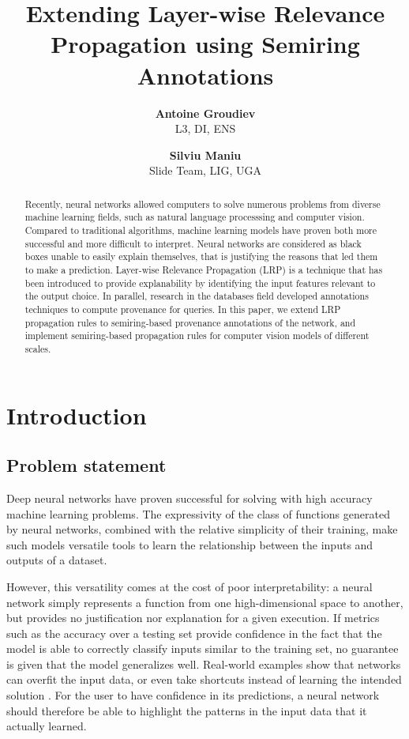 \documentclass{../cs-classes/cs-classes}
\title{Extending Layer-wise Relevance Propagation using Semiring Annotations}
\author{
    \textbf{Antoine Groudiev}\\L3, DI, ENS
    \and
    \textbf{Silviu Maniu}\\Slide Team, LIG, UGA
}
\newcommand*{\1}{\digitsbb{1}}
\newcommand*{\0}{\digitsbb{0}}
\begin{document}
\begin{abstract}
    Recently, neural networks allowed computers to solve numerous problems from diverse machine learning fields, such as natural language processsing and computer vision. Compared to traditional algorithms, machine learning models have proven both more successful and more difficult to interpret. Neural networks are considered as black boxes unable to easily explain themselves, that is justifying the reasons that led them to make a prediction. Layer-wise Relevance Propagation (LRP) is a technique that has been introduced to provide explanability by identifying the input features relevant to the output choice. In parallel, research in the databases field developed annotations techniques to compute provenance for queries. In this paper, we extend LRP propagation rules to semiring-based provenance annotations of the network, and implement semiring-based propagation rules for computer vision models of different scales.
\end{abstract}

\section{Introduction}
\subsection{Problem statement}
Deep neural networks have proven successful for solving with high accuracy machine learning problems. The expressivity of the class of functions generated by neural networks, combined with the relative simplicity of their training, make such models versatile tools to learn the relationship between the inputs and outputs of a dataset.

However, this versatility comes at the cost of poor interpretability: a neural network simply represents a function from one high-dimensional space to another, but provides no justification nor explanation for a given execution. If metrics such as the accuracy over a testing set provide confidence in the fact that the model is able to correctly classify inputs similar to the training set, no guarantee is given that the model generalizes well. Real-world examples show that networks can overfit the input data, or even take shortcuts instead of learning the intended solution \cite{shortcuts}. For the user to have confidence in its predictions, a neural network should therefore be able to highlight the patterns in the input data that it actually learned.
\end{document}

